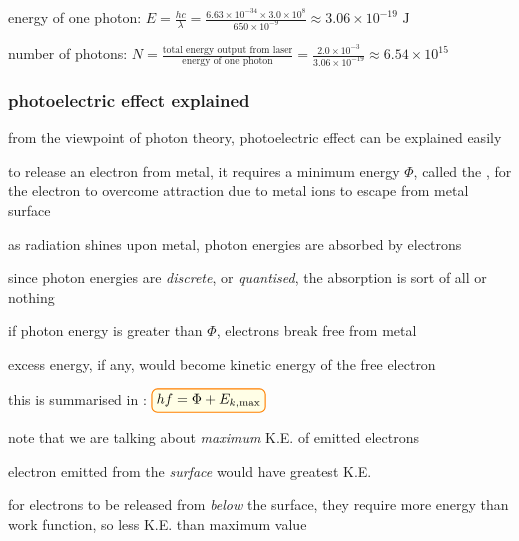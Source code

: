 \label{ex-redlaser}

\sol energy of one photon: $E = \frac{hc}{\lambda} = \frac{6.63\times10^{-34}\times3.0\times10^8}{650 \times10^{-9}} \approx 3.06\times10^{-19} \text{ J}$

\eqyskip number of photons: $N = \frac{\text{total energy output from laser}}{\text{energy of one photon}} = \frac{2.0\times10^{-3}}{3.06\times10^{-19}} \approx 6.54\times10^{15}$ \eoe






\subsubsection{photoelectric effect explained}

from the viewpoint of photon theory, photoelectric effect can be explained easily

to release an electron from metal, it requires a minimum energy $\Phi$, called the , for the electron to overcome attraction due to metal ions to escape from metal surface

as radiation shines upon metal, photon energies are absorbed by electrons

since photon energies are \emph{discrete}, or \emph{quantised}, the absorption is sort of all or nothing

if photon energy is greater than $\Phi$, electrons break free from metal

excess energy, if any, would become kinetic energy of the free electron

this is summarised in : $\boxed{hf = \Phi + E_{k,\tmax}}$

\cmt note that we are talking about \emph{maximum} K.E. of emitted electrons

electron emitted from the \emph{surface} would have greatest K.E.

for electrons to be released from \emph{below} the surface, they require more energy than work function, so less K.E. than maximum value

